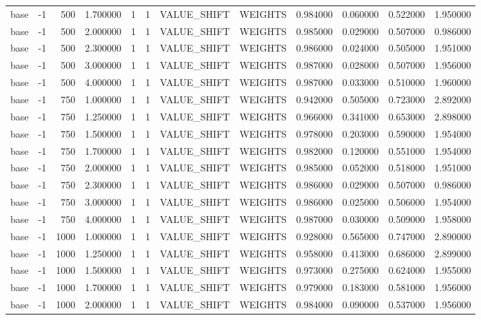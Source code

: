 \begin{tabular}{lrrrllllrrrr}
base & -1 & 500 & 1.700000 & 1 & 1 & VALUE_SHIFT & WEIGHTS & 0.984000 & 0.060000 & 0.522000 & 1.950000 \\
base & -1 & 500 & 2.000000 & 1 & 1 & VALUE_SHIFT & WEIGHTS & 0.985000 & 0.029000 & 0.507000 & 0.986000 \\
base & -1 & 500 & 2.300000 & 1 & 1 & VALUE_SHIFT & WEIGHTS & 0.986000 & 0.024000 & 0.505000 & 1.951000 \\
base & -1 & 500 & 3.000000 & 1 & 1 & VALUE_SHIFT & WEIGHTS & 0.987000 & 0.028000 & 0.507000 & 1.956000 \\
base & -1 & 500 & 4.000000 & 1 & 1 & VALUE_SHIFT & WEIGHTS & 0.987000 & 0.033000 & 0.510000 & 1.960000 \\
base & -1 & 750 & 1.000000 & 1 & 1 & VALUE_SHIFT & WEIGHTS & 0.942000 & 0.505000 & 0.723000 & 2.892000 \\
base & -1 & 750 & 1.250000 & 1 & 1 & VALUE_SHIFT & WEIGHTS & 0.966000 & 0.341000 & 0.653000 & 2.898000 \\
base & -1 & 750 & 1.500000 & 1 & 1 & VALUE_SHIFT & WEIGHTS & 0.978000 & 0.203000 & 0.590000 & 1.954000 \\
base & -1 & 750 & 1.700000 & 1 & 1 & VALUE_SHIFT & WEIGHTS & 0.982000 & 0.120000 & 0.551000 & 1.954000 \\
base & -1 & 750 & 2.000000 & 1 & 1 & VALUE_SHIFT & WEIGHTS & 0.985000 & 0.052000 & 0.518000 & 1.951000 \\
base & -1 & 750 & 2.300000 & 1 & 1 & VALUE_SHIFT & WEIGHTS & 0.986000 & 0.029000 & 0.507000 & 0.986000 \\
base & -1 & 750 & 3.000000 & 1 & 1 & VALUE_SHIFT & WEIGHTS & 0.986000 & 0.025000 & 0.506000 & 1.954000 \\
base & -1 & 750 & 4.000000 & 1 & 1 & VALUE_SHIFT & WEIGHTS & 0.987000 & 0.030000 & 0.509000 & 1.958000 \\
base & -1 & 1000 & 1.000000 & 1 & 1 & VALUE_SHIFT & WEIGHTS & 0.928000 & 0.565000 & 0.747000 & 2.890000 \\
base & -1 & 1000 & 1.250000 & 1 & 1 & VALUE_SHIFT & WEIGHTS & 0.958000 & 0.413000 & 0.686000 & 2.899000 \\
base & -1 & 1000 & 1.500000 & 1 & 1 & VALUE_SHIFT & WEIGHTS & 0.973000 & 0.275000 & 0.624000 & 1.955000 \\
base & -1 & 1000 & 1.700000 & 1 & 1 & VALUE_SHIFT & WEIGHTS & 0.979000 & 0.183000 & 0.581000 & 1.956000 \\
base & -1 & 1000 & 2.000000 & 1 & 1 & VALUE_SHIFT & WEIGHTS & 0.984000 & 0.090000 & 0.537000 & 1.956000 \\

\end{tabular}
